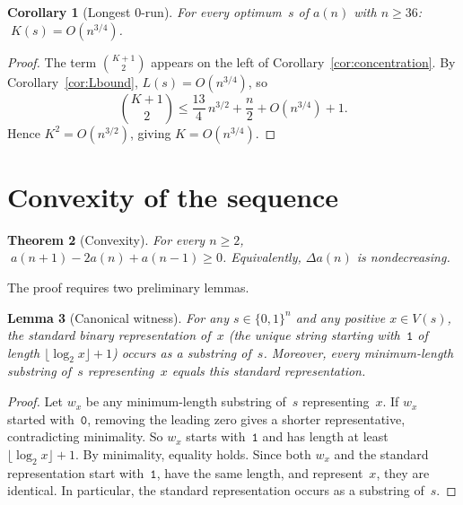 \documentclass[11pt,a4paper]{article}
\theoremstyle{plain}
\newtheorem{theorem}{Theorem}[section]
\newtheorem{lemma}[theorem]{Lemma}
\newtheorem{corollary}[theorem]{Corollary}
\theoremstyle{definition}
\theoremstyle{remark}
\newcommand{\Da}{\Delta a}
\begin{document}
\begin{corollary}[Longest $0$-run]\label{cor:Kbound}
  For every optimum~$s$ of $a(n)$ with $n \ge 36$:
  $\;K(s) = O(n^{3/4})$.
\end{corollary}

\begin{proof}
  The term $\binom{K{+}1}{2}$ appears on the left of
  Corollary~\ref{cor:concentration}.  By Corollary~\ref{cor:Lbound},
  $L(s) = O(n^{3/4})$, so
  \[
    \binom{K{+}1}{2}
    \le \frac{13}{4}\,n^{3/2} + \frac{n}{2} + O(n^{3/4}) + 1.
  \]
  Hence $K^2 = O(n^{3/2})$, giving $K = O(n^{3/4})$.
\end{proof}

\section{Convexity of the sequence}\label{sec:convexity}

\begin{theorem}[Convexity]\label{thm:convex}
  For every $n \ge 2$,
  $\;a(n{+}1) - 2a(n) + a(n{-}1) \ge 0$.
  Equivalently, $\Da(n)$ is nondecreasing.
\end{theorem}

The proof requires two preliminary lemmas.

\begin{lemma}[Canonical witness]\label{lem:canon}
  For any $s \in \{0,1\}^n$ and any positive $x \in V(s)$, the
  standard binary representation of~$x$ (the unique string starting
  with~$\mathtt{1}$ of length $\lfloor \log_2 x \rfloor + 1$)
  occurs as a substring of~$s$.  Moreover, every minimum-length
  substring of~$s$ representing~$x$ equals this standard
  representation.
\end{lemma}

\begin{proof}
  Let $w_x$ be any minimum-length substring of~$s$ representing~$x$.
  If $w_x$ started with~$\mathtt{0}$, removing the leading zero
  gives a shorter representative, contradicting minimality.  So
  $w_x$ starts with~$\mathtt{1}$ and has length at least
  $\lfloor \log_2 x \rfloor + 1$.  By minimality, equality holds.
  Since both $w_x$ and the standard representation start
  with~$\mathtt{1}$, have the same length, and represent~$x$, they
  are identical.  In particular, the standard representation occurs
  as a substring of~$s$.
\end{proof}
\end{document}
